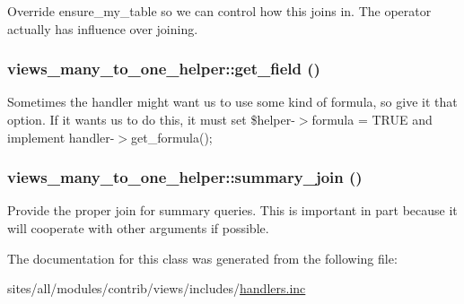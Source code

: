Override ensure\_\-my\_\-table so we can control how this joins in. The operator actually has influence over joining. \hypertarget{classviews__many__to__one__helper_f428c1a384a446883d9c862e1a5a35d1}{
\subsubsection[{get\_\-field}]{\setlength{\rightskip}{0pt plus 5cm}views\_\-many\_\-to\_\-one\_\-helper::get\_\-field ()}}
\label{classviews__many__to__one__helper_f428c1a384a446883d9c862e1a5a35d1}


Sometimes the handler might want us to use some kind of formula, so give it that option. If it wants us to do this, it must set \$helper-$>$formula = TRUE and implement handler-$>$get\_\-formula(); \hypertarget{classviews__many__to__one__helper_3cca1469412856288fcbaa5c1f627192}{
\subsubsection[{summary\_\-join}]{\setlength{\rightskip}{0pt plus 5cm}views\_\-many\_\-to\_\-one\_\-helper::summary\_\-join ()}}
\label{classviews__many__to__one__helper_3cca1469412856288fcbaa5c1f627192}


Provide the proper join for summary queries. This is important in part because it will cooperate with other arguments if possible. 

The documentation for this class was generated from the following file:\begin{CompactItemize}
\item 
sites/all/modules/contrib/views/includes/\hyperlink{handlers_8inc}{handlers.inc}\end{CompactItemize}
